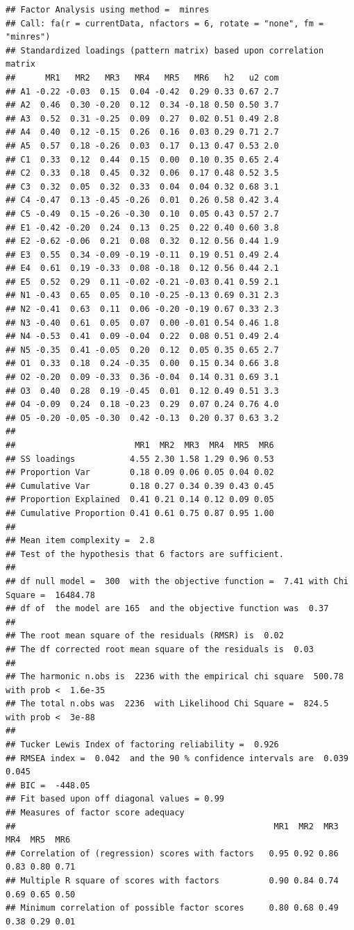 \documentclass[
]{ctexart}
\begin{document}
\begin{verbatim}
## Factor Analysis using method =  minres
## Call: fa(r = currentData, nfactors = 6, rotate = "none", fm = "minres")
## Standardized loadings (pattern matrix) based upon correlation matrix
##      MR1   MR2   MR3   MR4   MR5   MR6   h2   u2 com
## A1 -0.22 -0.03  0.15  0.04 -0.42  0.29 0.33 0.67 2.7
## A2  0.46  0.30 -0.20  0.12  0.34 -0.18 0.50 0.50 3.7
## A3  0.52  0.31 -0.25  0.09  0.27  0.02 0.51 0.49 2.8
## A4  0.40  0.12 -0.15  0.26  0.16  0.03 0.29 0.71 2.7
## A5  0.57  0.18 -0.26  0.03  0.17  0.13 0.47 0.53 2.0
## C1  0.33  0.12  0.44  0.15  0.00  0.10 0.35 0.65 2.4
## C2  0.33  0.18  0.45  0.32  0.06  0.17 0.48 0.52 3.5
## C3  0.32  0.05  0.32  0.33  0.04  0.04 0.32 0.68 3.1
## C4 -0.47  0.13 -0.45 -0.26  0.01  0.26 0.58 0.42 3.4
## C5 -0.49  0.15 -0.26 -0.30  0.10  0.05 0.43 0.57 2.7
## E1 -0.42 -0.20  0.24  0.13  0.25  0.22 0.40 0.60 3.8
## E2 -0.62 -0.06  0.21  0.08  0.32  0.12 0.56 0.44 1.9
## E3  0.55  0.34 -0.09 -0.19 -0.11  0.19 0.51 0.49 2.4
## E4  0.61  0.19 -0.33  0.08 -0.18  0.12 0.56 0.44 2.1
## E5  0.52  0.29  0.11 -0.02 -0.21 -0.03 0.41 0.59 2.1
## N1 -0.43  0.65  0.05  0.10 -0.25 -0.13 0.69 0.31 2.3
## N2 -0.41  0.63  0.11  0.06 -0.20 -0.19 0.67 0.33 2.3
## N3 -0.40  0.61  0.05  0.07  0.00 -0.01 0.54 0.46 1.8
## N4 -0.53  0.41  0.09 -0.04  0.22  0.08 0.51 0.49 2.4
## N5 -0.35  0.41 -0.05  0.20  0.12  0.05 0.35 0.65 2.7
## O1  0.33  0.18  0.24 -0.35  0.00  0.15 0.34 0.66 3.8
## O2 -0.20  0.09 -0.33  0.36 -0.04  0.14 0.31 0.69 3.1
## O3  0.40  0.28  0.19 -0.45  0.01  0.12 0.49 0.51 3.3
## O4 -0.09  0.24  0.18 -0.23  0.29  0.07 0.24 0.76 4.0
## O5 -0.20 -0.05 -0.30  0.42 -0.13  0.20 0.37 0.63 3.2
## 
##                        MR1  MR2  MR3  MR4  MR5  MR6
## SS loadings           4.55 2.30 1.58 1.29 0.96 0.53
## Proportion Var        0.18 0.09 0.06 0.05 0.04 0.02
## Cumulative Var        0.18 0.27 0.34 0.39 0.43 0.45
## Proportion Explained  0.41 0.21 0.14 0.12 0.09 0.05
## Cumulative Proportion 0.41 0.61 0.75 0.87 0.95 1.00
## 
## Mean item complexity =  2.8
## Test of the hypothesis that 6 factors are sufficient.
## 
## df null model =  300  with the objective function =  7.41 with Chi Square =  16484.78
## df of  the model are 165  and the objective function was  0.37 
## 
## The root mean square of the residuals (RMSR) is  0.02 
## The df corrected root mean square of the residuals is  0.03 
## 
## The harmonic n.obs is  2236 with the empirical chi square  500.78  with prob <  1.6e-35 
## The total n.obs was  2236  with Likelihood Chi Square =  824.5  with prob <  3e-88 
## 
## Tucker Lewis Index of factoring reliability =  0.926
## RMSEA index =  0.042  and the 90 % confidence intervals are  0.039 0.045
## BIC =  -448.05
## Fit based upon off diagonal values = 0.99
## Measures of factor score adequacy             
##                                                    MR1  MR2  MR3  MR4  MR5  MR6
## Correlation of (regression) scores with factors   0.95 0.92 0.86 0.83 0.80 0.71
## Multiple R square of scores with factors          0.90 0.84 0.74 0.69 0.65 0.50
## Minimum correlation of possible factor scores     0.80 0.68 0.49 0.38 0.29 0.01
\end{verbatim}
\end{document}
